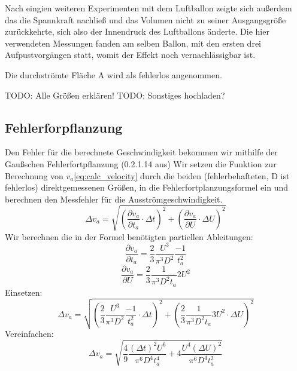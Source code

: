 \documentclass{article}
\begin{document}
            Nach eingien weiteren Experimenten mit dem Luftballon zeigte sich außerdem das die Spannkraft nachließ und das Volumen
            nicht zu seiner Ausgangsgröße zurückkehrte, sich also der Innendruck des Luftballons änderte.
            Die hier verwendeten Messungen fanden am selben Ballon, mit den ersten drei Aufpustvorgängen statt, womit der Effekt noch vernachlässigbar ist.

            Die durchströmte Fläche A wird als fehlerlos angenommen.

        TODO: Alle Größen erklären!
        TODO: Sonstiges hochladen?

        \subsection{Fehlerforpflanzung}
            Den Fehler für die berechnete Geschwindigkeit bekommen wir mithilfe der Gaußschen Fehlerfortpflanzung (0.2.1.14 aus\cite{AnleitungPraktikum})
            Wir setzen die Funktion zur Berechnung von \(v_a\)\ref{eq:calc_velocity} durch die beiden (fehlerbehafteten, D ist fehlerlos)
            direktgemessenen Größen, in die Fehlerfortplanzungsformel ein und berechnen den Messfehler für die Ausströmgeschwindigkeit. 
            \begin{equation}
                \Delta v_a = \sqrt{ {\left( \frac{ \partial v_a }{ \partial t_a } \cdot \Delta t \right)}^2 + {\left( \frac{ \partial v_a }{ \partial U } \cdot \Delta U \right)}^2 }
            \end{equation}
            Wir berechnen die in der Formel benötigten partiellen Ableitungen:
            \begin{equation}
                 \frac{\partial v_a}{ \partial t_a} = \frac{2}{3} \frac{U^3}{\pi^3 D^2} \frac{-1}{t_a^2}
            \end{equation}
            \begin{equation}
                \frac{\partial v_a}{ \partial U} = \frac{2}{3} \frac{1}{\pi^3 D^2 t_a} 2 U^2
            \end{equation}
            Einsetzen:
            \begin{equation}
                \Delta v_a = \sqrt{ {\left( \frac{2}{3} \frac{U^3}{\pi^3 D^2} \frac{-1}{t_a^2} \cdot \Delta t \right) }^2 
                + {\left( \frac{2}{3} \frac{1}{\pi^3 D^2 t_a} 3 U^2 \cdot \Delta U \right)}^2 }
            \end{equation}
            Vereinfachen:
            \begin{equation} \label{eq:fehler}
                \Delta v_a = \sqrt{ \frac{4}{9} \frac{ {(\Delta t)}^2 U^6}{\pi^6 D^4 t_a^4} + 4 \frac{U^4 {(\Delta U)}^2}{\pi^6 D^4 t_a^2}}
            \end{equation}
\end{document}
